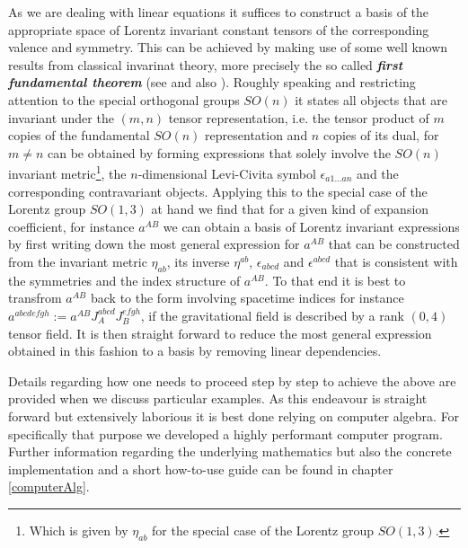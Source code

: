 \documentclass[a4paper,12pt, DIV=14, BCOR=5mm, twoside, headsepline]{scrbook}
\begin{document}
As we are dealing with linear equations it suffices to construct a basis of the appropriate space of Lorentz invariant constant tensors of the corresponding valence and symmetry. This can be achieved by making use of some well known results from classical invarinat theory, more precisely the so called \textit{\textbf{first fundamental theorem}} (see \cite{Aslaksen1995InvariantTO} and also \cite{PROCESI1976306}). Roughly speaking and restricting attention to the special orthogonal groups $SO(n)$ it states all objects that are invariant under the $(m,n)$ tensor representation, i.e. the tensor product of $m$ copies of the fundamental $SO(n)$ representation and $n$ copies of its dual, for $m \neq n$ can be obtained by forming expressions that solely involve the $SO(n)$ invariant metric\footnote{Which is given by $\eta_{ab}$ for the special case of the Lorentz group $SO(1,3)$.}, the $n$-dimensional Levi-Civita symbol $\epsilon_{a1...an}$ and the corresponding contravariant objects. Applying this to the special case of the Lorentz group $SO(1,3)$ at hand we find that for a given kind of expansion coefficient, for instance $a^{AB}$ we can obtain a basis of Lorentz invariant expressions by first writing down the most general expression for $a^{AB}$ that can be constructed from the invariant metric $\eta_{ab}$, its inverse $\eta^{ab}$, $\epsilon_{abcd}$ and $\epsilon^{abcd}$ that is consistent with the symmetries and the index structure of $a^{AB}$. To that end it is best to transfrom $a^{AB}$ back to the form involving spacetime indices for instance $a^{abcdefgh} := a^{AB}J_A^{abcd}J_B^{efgh}$, if the gravitational field is described by a rank $(0,4)$ tensor field. It is then straight forward to reduce the most general expression obtained in this fashion to a basis by removing linear dependencies.

Details regarding how one needs to proceed step by step to achieve the above are provided when we discuss particular examples. As this endeavour is straight forward but extensively laborious it is best done relying on computer algebra. For specifically that purpose we developed a highly performant computer program. 
Further information regarding the underlying mathematics but also the concrete implementation and a short how-to-use guide can be found in chapter \ref{computerAlg}. \\
\end{document}
